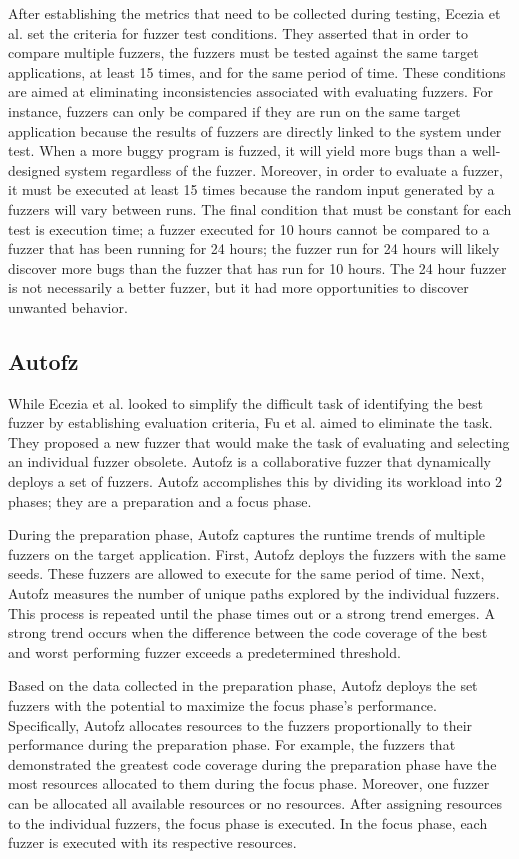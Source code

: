 After establishing the metrics that need to be collected during testing, Ecezia et al. 
set the criteria for fuzzer test conditions. They asserted that in order to compare 
multiple fuzzers, the fuzzers must be tested against the same target applications, at 
least 15 times, and for the same period of time. These conditions are aimed at eliminating 
inconsistencies associated with evaluating fuzzers. For instance, fuzzers can only be 
compared if they are run on the same target application because the results of fuzzers 
are directly linked to the system under test. When a more buggy program is fuzzed, it 
will yield more bugs than a well-designed system regardless of the fuzzer. Moreover, 
in order to evaluate a fuzzer, it must be executed at least 15 times because the random 
input generated by a fuzzers will vary between runs. The final condition that must be 
constant for each test is execution time; a fuzzer executed for 10 hours cannot be 
compared to a fuzzer that has been running for 24 hours; the fuzzer run for 24 hours 
will likely discover more bugs than the fuzzer that has run for 10 hours. The 24 hour 
fuzzer is not necessarily a better fuzzer, but it had more opportunities to discover 
unwanted behavior. \cite{Ecezia}

\subsection{Autofz}
While Ecezia et al. looked to simplify the difficult task of identifying the best 
fuzzer by establishing evaluation criteria, Fu et al. aimed to eliminate the task. 
They proposed a new fuzzer that would make the task of evaluating and selecting an 
individual fuzzer obsolete. Autofz is a collaborative fuzzer that dynamically deploys 
a set of fuzzers. Autofz accomplishes this by dividing its workload into 2 phases; 
they are a preparation and a focus phase. 

During the preparation phase, Autofz captures the runtime trends of multiple fuzzers
on the target application. First, Autofz deploys the fuzzers with the same seeds. 
These fuzzers are allowed to execute for the same period of time. Next, Autofz 
measures the number of unique paths explored by the individual fuzzers. This 
process is repeated until the phase times out or a strong trend emerges. A strong 
trend occurs when the difference between the code coverage of the best and worst 
performing fuzzer exceeds a predetermined threshold. 

Based on the data collected in the preparation phase, Autofz deploys 
the set fuzzers with the potential to maximize the focus phase’s performance.
Specifically, Autofz allocates resources to the fuzzers proportionally 
to their performance during the preparation phase. For example, the fuzzers
that demonstrated the greatest code coverage during the preparation phase 
have the most resources allocated to them during the focus phase. Moreover, 
one fuzzer can be allocated all available resources or no resources. After 
assigning resources to the individual fuzzers, the focus phase is executed. In 
the focus phase, each fuzzer is executed with its respective resources.

